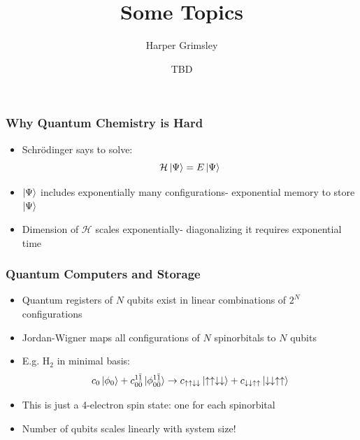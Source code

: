 \documentclass[aspectratio=169]{beamer}
\title{Some Topics}
\author{Harper Grimsley}
\date{TBD}
\begin{document}
\frame{\titlepage}

\begin{frame}
	\frametitle{Why Quantum Chemistry is Hard}
	\begin{itemize}[<+->]
		\item Schr{\"o}dinger says to solve:
			\begin{equation}\nonumber
			\mathcal{H}\ket{\Psi} = E\ket{\Psi}
			\end{equation}
		\item $\ket{\Psi}$ includes exponentially many configurations- exponential memory to store $\ket{\Psi}$
		\item Dimension of $\mathcal{H}$ scales exponentially- diagonalizing it requires exponential time
	\end{itemize}
\end{frame}

\begin{frame}
	\frametitle{Quantum Computers and Storage}
	\begin{itemize}[<+->]
		\item Quantum registers of $N$ qubits exist in linear combinations of $2^N$ configurations
		\item Jordan-Wigner maps all configurations of $N$ spinorbitals to $N$ qubits
		\item E.g. H$_2$ in minimal basis:
			\begin{equation}\nonumber
				c_0\ket{\phi_0} + c_{0\bar{0}}^{1\bar{1}}\ket{\phi_{0\bar{0}}^{1\bar{1}}}\rightarrow c_{\uparrow\uparrow\downarrow\downarrow}\ket{\uparrow\uparrow\downarrow\downarrow}+c_{\downarrow\downarrow\uparrow\uparrow}\ket{\downarrow\downarrow\uparrow\uparrow}
			\end{equation}
		\item This is just a 4-electron spin state: one for each spinorbital
	        \item Number of qubits scales linearly with system size!
	\end{itemize}
\end{frame}
\end{document}
